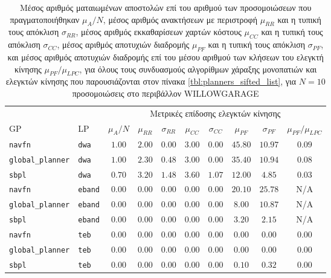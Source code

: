 \begin{table}[h]\hspace{-0.5cm}
\renewcommand{\arraystretch}{1.3}
\begin{tabular}{llcccccccc}
  & & \multicolumn{8}{c}{Μετρικές επίδοσης ελεγκτών κίνησης} \\
  \cline{3-10}
    GP & LP & $\mu_{A} / N$ & $\mu_{RR}$ & $\sigma_{RR}$ & $\mu_{CC}$ & $\sigma_{CC}$ & $\mu_{PF}$ & $\sigma_{PF}$ & $\mu_{PF} / \mu_{LPC}$ \\ \toprule
    \texttt{navfn} & \texttt{dwa} & $1.00$ & $2.00$ & $0.00$ & $3.00$ & $0.00$ & $45.80$ & $10.97$ & $0.09$ \\
    \texttt{global\_planner} & \texttt{dwa} & $1.00$ & $2.30$ & $0.48$ & $3.00$ & $0.00$ & $35.40$ & $10.94$ & $0.08$ \\
    \texttt{sbpl} & \texttt{dwa} & $0.70$ & $3.20$ & $1.48$ & $3.60$ & $1.07$ & $12.00$ & $4.85$ & $0.03$ \\
    \texttt{navfn} & \texttt{eband} & $0.00$ & $0.00$ & $0.00$ & $0.00$ & $0.00$ & $20.10$ & $25.78$ & N/A \\
    \texttt{global\_planner} & \texttt{eband} & $0.00$ & $0.00$ & $0.00$ & $0.00$ & $0.00$ & $8.00$ & $10.87$ & N/A \\
    \texttt{sbpl} & \texttt{eband} & $0.00$ & $0.00$ & $0.00$ & $0.00$ & $0.00$ & $3.20$ & $2.15$ & N/A \\
    \texttt{navfn} & \texttt{teb} & $0.00$ & $0.00$ & $0.00$ & $0.00$ & $0.00$ & $0.00$ & $0.00$ & $0.00$ \\
    \texttt{global\_planner} & \texttt{teb} & $0.00$ & $0.00$ & $0.00$ & $0.00$ & $0.00$ & $0.00$ & $0.00$ & $0.00$ \\
    \texttt{sbpl} & \texttt{teb} & $0.00$ & $0.00$ & $0.00$ & $0.00$ & $0.00$ & $0.10$ & $0.32$ & $0.00$ \\ \bottomrule
\end{tabular}
\caption{\small Μέσος αριθμός ματαιωμένων αποστολών επί του αριθμού των
      προσομοιώσεων που πραγματοποιήθηκαν $\mu_A / N$, μέσος αριθμός ανακτήσεων
      με περιστροφή $\mu_{RR}$ και η τυπική τους απόκλιση $\sigma_{RR}$, μέσος
      αριθμός εκκαθαρίσεων χαρτών κόστους $\mu_{CC}$ και η τυπική τους απόκλιση
      $\sigma_{CC}$, μέσος αριθμός αποτυχιών διαδρομής $\mu_{PF}$ και η τυπική
      τους απόκλιση $\sigma_{PF}$, και μέσος αριθμός αποτυχιών διαδρομής επί
      του μέσου αριθμού των κλήσεων του ελεγκτή κίνησης $\mu_{PF} / \mu_{LPC}$,
      για όλους τους συνδυασμούς αλγορίθμων χάραξης μονοπατιών και ελεγκτών
      κίνησης που παρουσιάζονται στον πίνακα \ref{tbl:planners_sifted_list},
      για $N=10$ προσομοιώσεις στο περιβάλλον WILLOWGARAGE}
\label{tbl:info_failures_willowgarage}
\end{table}


